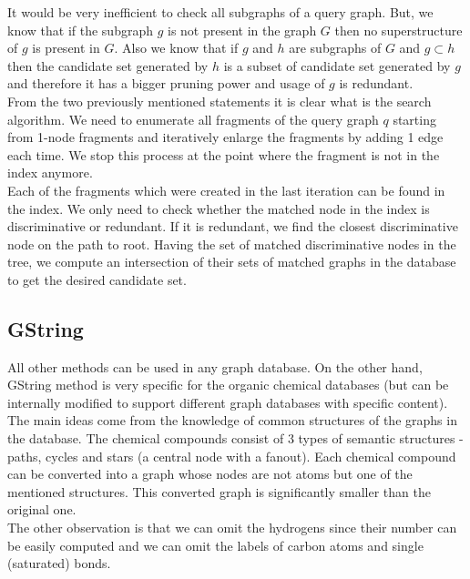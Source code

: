 It would be very inefficient to check all subgraphs of a query graph. But, we know that if the subgraph $ g $ is not present in the graph $ G $ then no superstructure of $ g $ is present in $ G $. Also we know that if $ g $ and $ h $ are subgraphs of $ G $ and $ g \subset h $ then the candidate set generated by $ h $ is a subset of candidate set generated by $ g $ and therefore it has a bigger pruning power and usage of $ g $ is redundant.\\

From the two previously mentioned statements it is clear what is the search algorithm. We need to enumerate all fragments of the query graph $ q $ starting from 1-node fragments and iteratively enlarge the fragments by adding 1 edge each time. We stop this process at the point where the fragment is not in the index anymore.\\

Each of the fragments which were created in the last iteration can be found in the index. We only need to check whether the matched node in the index is discriminative or redundant. If it is redundant, we find the closest discriminative node on the path to root. Having the set of matched discriminative nodes in the tree, we compute an intersection of their sets of matched graphs in the database to get the desired candidate set.

\subsection{GString}

All other methods can be used in any graph database. On the other hand, GString method is very specific for the organic chemical databases (but can be internally modified to support different graph databases with specific content).\\

The main ideas come from the knowledge of common structures of the graphs in the database. The chemical compounds consist of 3 types of semantic structures - paths, cycles and stars (a central node with a fanout). Each chemical compound can be converted into a graph whose nodes are not atoms but one of the mentioned structures. This converted graph is significantly smaller than the original one.\\

The other observation is that we can omit the hydrogens since their number can be easily computed and we can omit the labels of carbon atoms and single (saturated) bonds.\\

